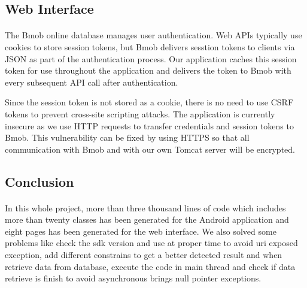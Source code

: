 \subsection{Web Interface}
\paragraph{} The Bmob online database manages user authentication.  Web APIs typically use cookies to store session tokens, but Bmob delivers sesstion tokens to clients via JSON as part of the authentication process.  Our application caches this session token for use throughout the application and delivers the token to Bmob with every subsequent API call after authentication.  
\par Since the session token is not stored as a cookie, there is no need to use CSRF tokens to prevent cross-site scripting attacks. The application is currently insecure as we use HTTP requests to transfer credentials and session tokens to Bmob.  This vulnerability can be fixed by using HTTPS so that all communication with Bmob and with our own Tomcat server will be encrypted. 
\subsection{Conclusion}
\paragraph{} 
In this whole project, more than three thousand lines of code which includes more than twenty classes has been generated for the Android application and eight pages has been generated for the web interface. We also solved some problems like check the sdk version and use  at proper time to avoid uri exposed exception, add different constrains to get a better detected result and when retrieve data from database, execute the code in main thread and check if data retrieve is finish to avoid asynchronous brings null pointer exceptions.   
